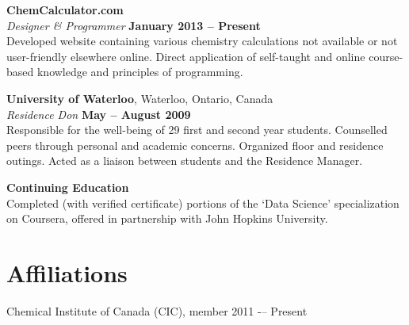 \documentclass[margin,line]{resume}
\begin{document}
\begin{resume}
    \textbf{ChemCalculator.com}\\\vspace{1mm}%
    \textsl{Designer \& Programmer} \hfill \textbf{January 2013 -- Present}\\
    Developed website containing various chemistry calculations not available or not user-friendly elsewhere online. Direct application of self-taught and online course-based knowledge and principles of programming. 

    \textbf{University of Waterloo}, Waterloo, Ontario, Canada\\\vspace{1mm}%
    \textsl{Residence Don} \hfill \textbf{May -- August 2009}\\
    Responsible for the well-being of 29 first and second year students. Counselled peers through personal and academic concerns. Organized floor and residence outings. Acted as a liaison between students and the Residence Manager.

	\textbf{Continuing Education}\\
	Completed (with verified certificate) portions of the `Data Science' specialization on Coursera, offered in partnership with John Hopkins University.
	
\vspace{1mm}
    \section{\mysidestyle Affiliations} 

    Chemical Institute of Canada (CIC), member 2011 -– Present


\end{resume}
\end{document}
